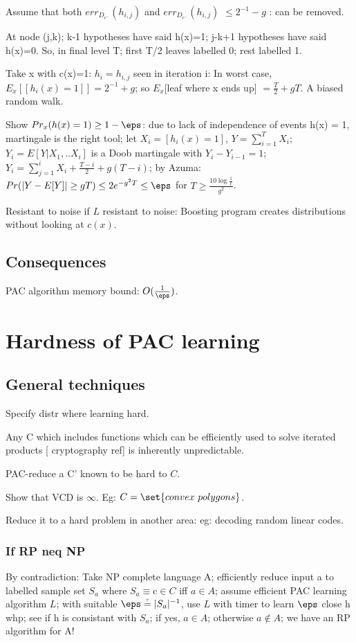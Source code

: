 \documentclass[oneside, article]{memoir}
\begin{document}
Assume that both $err_{D_{c^{-}}}(h_{i,j})$ and $err_{D_{c^{-}}}(h_{i,j})$ $\leq 2^{-1} - g$ : can be removed. \why

At node (j,k); k-1 hypotheses have said h(x)=1; j-k+1 hypotheses have said h(x)=0. So, in final level T; first T/2 leaves labelled 0; rest labelled 1.

Take x with c(x)=1: $h_{i} = h_{i,j}$ seen in iteration i: In worst case, $E_{x}[[h_{i}(x) = 1]] = 2^{-1} + g$; so $E_{x}$[leaf where x ends up] $ = \frac{T}{2} + gT$. A biased random walk.

Show $Pr_{x}(h(x) = 1)\geq 1-\eps$: due to lack of independence of events h(x) = 1, martingale is the right tool; let $X_{i} = [h_{i}(x) = 1]$, $Y = \sum_{i=1}^{T} X_{i}$; $Y_{i} = E[Y|X_{1}, .. X_{i}]$ is a Doob martingale with $Y_{i}-Y_{i-1}=1$; $Y_{i} = \sum_{j=1}^{i} X_{i} + \frac{T-i}{2} + g(T-i)$; by Azuma: $Pr(|Y-E[Y]|\geq gT) \leq 2e^{-g^{2}T} \leq \eps$ for $T \geq \frac{10 \log \frac{1}{t}}{g^{2}}$.

Resistant to noise if $L$ resistant to noise: Boosting program creates distributions without looking at $c(x)$.

\subsection{Consequences}
PAC algorithm memory bound: $O(\frac{1}{\eps})$. \why

\section{Hardness of PAC learning}

\subsection{General techniques}
Specify distr where learning hard.

Any C which includes functions which can be efficiently used to solve iterated products [ cryptography ref] is inherently unpredictable.

PAC-reduce a C' known to be hard to $C$.

Show that VCD is $\infty$. Eg: $C = \set{convex\ polygons}$.

Reduce it to a hard problem in another area: eg: decoding random linear codes.

\subsubsection{If RP neq NP}
By contradiction: Take NP complete language A; efficiently reduce input a to labelled sample set $S_{a}$ where $S_{a} \equiv $c$ \in C$ iff $a \in A$; assume efficient PAC learning algorithm $L$; with suitable $\eps \stackrel{_?}{=} |S_{a}|^{-1}$, use $L$ with timer to learn $\eps$ close h whp; see if h is consistant with $S_{a}$; if yes, $a \in A$; otherwise $a \notin A$; we have an RP algorithm for A!
\end{document}

